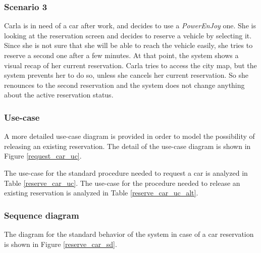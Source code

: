 \subsubsection{Scenario 3}
Carla is in need of a car after work, and decides to use a \emph{PowerEnJoy} one. She is looking at the reservation screen and decides to reserve a vehicle by selecting it. Since she is not sure that she will be able to reach the vehicle easily, she tries to reserve a second one after a few minutes. At that point, the system shows a visual recap of her current reservation. Carla tries to access the city map, but the system prevents her to do so, unless she cancels her current reservation. So she renounces to the second reservation and the system does not change anything about the active reservation status.

\subsubsection{Use-case}
A more detailed use-case diagram is provided in order to model the possibility of releasing an existing reservation. The detail of the use-case diagram is shown in Figure \ref{request_car_uc}.

The use-case for the standard procedure needed to request a car is analyzed in Table \ref{reserve_car_uc}.
The use-case for the procedure needed to release an existing reservation is analyzed in Table \ref{reserve_car_uc_alt}.

\subsubsection{Sequence diagram}
The diagram for the standard behavior of the system in case of a car reservation is shown in Figure \ref{reserve_car_sd}.

